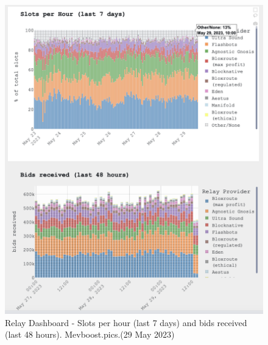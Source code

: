 \documentclass[UTF8]{article}
\begin{document}
\begin{figure}[htbp]
\begin{center}
\includegraphics[width=0.9\linewidth]{images/mevrelay2}
\caption{Relay Dashboard - Slots per hour (last 7 days) and bids received (last 48 hours). Mevboost.pics.(29 May 2023)}
\label{fig:mevrelay2}
\end{center}
\end{figure}
\end{document}
